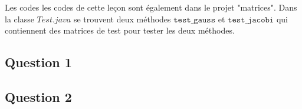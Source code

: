 Les codes les codes de cette leçon sont également dans le projet "matrices". Dans la classe $Test.java$ se trouvent deux méthodes $\texttt{test\_gauss}$ et $\texttt{test\_jacobi}$ qui contiennent des matrices de test pour tester les deux méthodes.

\subsection{Question 1}

\subsection{Question 2}
